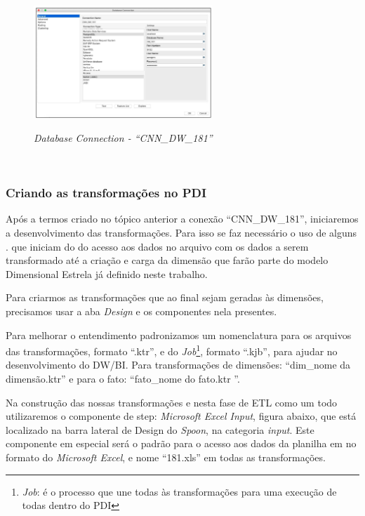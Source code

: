 \begin{figure}[H]
	\vspace*{0,2cm}
    \centering
    \caption{\textit{Database Connection - ``CNN\_DW\_181''}}
    \includegraphics[width=0.6\textwidth]{./04-figuras/figura-pentaho-database-connection}
    \label{fig:ilustfigpentaho-database-connection}
\end{figure}
\vspace*{-0,9cm}
{\raggedright {}} \\

\subsubsection{Criando as transforma\c{c}\~{o}es no PDI}

Ap\'os a termos criado no t\'opico anterior a conex\~{a}o ``CNN\_DW\_181'', iniciaremos a desenvolvimento das transforma\c{c}\~{o}es. Para isso se faz necess\'{a}rio o uso de alguns . que iniciam do do acesso aos dados no arquivo com os dados a serem transformado at\'{e} a cria\c{c}\~{a}o e carga da dimens\~{a}o que far\~{a}o parte do modelo Dimensional Estrela j\'{a} definido neste trabalho.

Para criarmos as transforma\c{c}\~{o}es que ao final sejam geradas \`{a}s dimens\~{o}es, precisamos usar a aba \textit{Design} e os componentes nela presentes.

Para melhorar o entendimento padronizamos um nomenclatura para os arquivos das transforma\c{c}\~{o}es, formato ``.ktr'', e do \textit{Job}\footnote{\textit{Job}: \'{e} o processo que une todas \`{a}s transforma\c{c}\~{o}es para uma execu\c{c}\~{a}o de todas dentro do PDI}, formato ``.kjb'', para ajudar no desenvolvimento do DW/BI. Para transforma\c{c}\~{o}es de dimens\~{o}es: ``dim\_nome da dimens\~{a}o.ktr'' e para o fato: ``fato\_nome do fato.ktr
''.

Na constru\c{c}\~{a}o das nossas transforma\c{c}\~{o}es e nesta fase de ETL como um todo utilizaremos o componente de step: \textit{Microsoft Excel Input}, figura abaixo, que est\'{a} localizado na barra lateral de Design do \textit{Spoon}, na categoria \textit{input}. Este componente em especial ser\'{a} o padr\~{a}o para o acesso aos dados da planilha em no formato do \textit{Microsoft Excel}, e nome ``181.xls'' em todas as transforma\c{c}\~{o}es.

